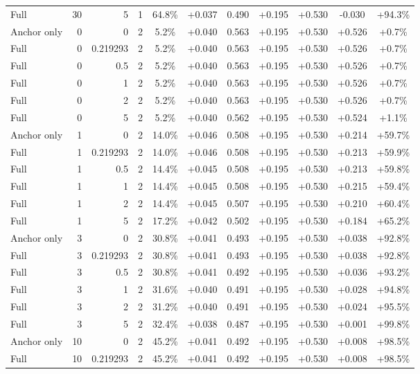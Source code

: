 \begin{table}[htbp]
\begin{tabular}{lrrrccccccc}
Full & 30 & 5 & 1 & 64.8\% & +0.037 & 0.490 & +0.195 & +0.530 & -0.030 & +94.3\% \\
Anchor only & 0 & 0 & 2 & 5.2\% & +0.040 & 0.563 & +0.195 & +0.530 & +0.526 & +0.7\% \\
Full & 0 & 0.219293 & 2 & 5.2\% & +0.040 & 0.563 & +0.195 & +0.530 & +0.526 & +0.7\% \\
Full & 0 & 0.5 & 2 & 5.2\% & +0.040 & 0.563 & +0.195 & +0.530 & +0.526 & +0.7\% \\
Full & 0 & 1 & 2 & 5.2\% & +0.040 & 0.563 & +0.195 & +0.530 & +0.526 & +0.7\% \\
Full & 0 & 2 & 2 & 5.2\% & +0.040 & 0.563 & +0.195 & +0.530 & +0.526 & +0.7\% \\
Full & 0 & 5 & 2 & 5.2\% & +0.040 & 0.562 & +0.195 & +0.530 & +0.524 & +1.1\% \\
Anchor only & 1 & 0 & 2 & 14.0\% & +0.046 & 0.508 & +0.195 & +0.530 & +0.214 & +59.7\% \\
Full & 1 & 0.219293 & 2 & 14.0\% & +0.046 & 0.508 & +0.195 & +0.530 & +0.213 & +59.9\% \\
Full & 1 & 0.5 & 2 & 14.4\% & +0.045 & 0.508 & +0.195 & +0.530 & +0.213 & +59.8\% \\
Full & 1 & 1 & 2 & 14.4\% & +0.045 & 0.508 & +0.195 & +0.530 & +0.215 & +59.4\% \\
Full & 1 & 2 & 2 & 14.4\% & +0.045 & 0.507 & +0.195 & +0.530 & +0.210 & +60.4\% \\
Full & 1 & 5 & 2 & 17.2\% & +0.042 & 0.502 & +0.195 & +0.530 & +0.184 & +65.2\% \\
Anchor only & 3 & 0 & 2 & 30.8\% & +0.041 & 0.493 & +0.195 & +0.530 & +0.038 & +92.8\% \\
Full & 3 & 0.219293 & 2 & 30.8\% & +0.041 & 0.493 & +0.195 & +0.530 & +0.038 & +92.8\% \\
Full & 3 & 0.5 & 2 & 30.8\% & +0.041 & 0.492 & +0.195 & +0.530 & +0.036 & +93.2\% \\
Full & 3 & 1 & 2 & 31.6\% & +0.040 & 0.491 & +0.195 & +0.530 & +0.028 & +94.8\% \\
Full & 3 & 2 & 2 & 31.2\% & +0.040 & 0.491 & +0.195 & +0.530 & +0.024 & +95.5\% \\
Full & 3 & 5 & 2 & 32.4\% & +0.038 & 0.487 & +0.195 & +0.530 & +0.001 & +99.8\% \\
Anchor only & 10 & 0 & 2 & 45.2\% & +0.041 & 0.492 & +0.195 & +0.530 & +0.008 & +98.5\% \\
Full & 10 & 0.219293 & 2 & 45.2\% & +0.041 & 0.492 & +0.195 & +0.530 & +0.008 & +98.5\% \\

\end{tabular}
\end{table}
